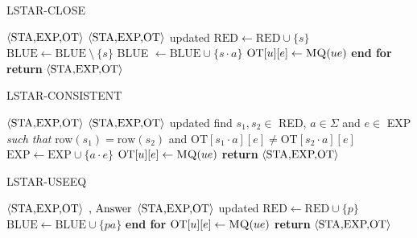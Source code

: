 \begin{algorithm}
\caption{LSTAR-CLOSE}\label{alg:lstar-close}
\begin{algorithmic}[1]
\Statex
\Input $\Braket{\text{STA,EXP,OT}}$
\Output $\Braket{\text{STA,EXP,OT}}$ updated
     \State $\text{RED} \gets \text{RED} \cup \{s\}$
     \State $\text{BLUE} \gets \text{BLUE} \: \setminus \: \{s\}$
      BLUE $\gets \text{BLUE} \cup \{s\cdot a\}$
     \EndFor
      $\text{OT}[u][e] \gets \Call{MQ}{ue}$
\EndFor
\EndFor
\State \textbf{end for}
\State \textbf{return} $\Braket{\text{STA,EXP,OT}}$
\end{algorithmic}
\end{algorithm}

\begin{algorithm}
\caption{LSTAR-CONSISTENT}\label{alg:lstar-consistent}
\begin{algorithmic}[1]
\Statex
\Input $\Braket{\text{STA,EXP,OT}}$
\Output $\Braket{\text{STA,EXP,OT}}$ updated
\State find $s_1, s_2 \in$ RED, $a \in \Sigma$ and $e \in$ EXP \textit{such that} row$(s_1) = \text{row}(s_2)$ and
\State $\text{OT}[s_1 \cdot a][e] \ne \text{OT}[s_2 \cdot a][e]$
\State $\text{EXP} \gets \text{EXP} \cup \{a \cdot e\}$ 
 $\text{OT}[u][e] \gets \Call{MQ}{ue}$
\EndFor
\State \textbf{return} $\Braket{\text{STA,EXP,OT}}$
\end{algorithmic}
\end{algorithm}

\begin{algorithm}
\caption{LSTAR-USEEQ}\label{alg:lstar-useeq}
\begin{algorithmic}[1]
\Statex
\Input $\Braket{\text{STA,EXP,OT}} \text{ ,  Answer}$
\Output $\Braket{\text{STA,EXP,OT}}$ updated
     \State $\text{RED} \gets \text{RED} \cup \{p\}$
      $\text{BLUE} \gets \text{BLUE} \cup \{pa\}$ 
     \EndFor 
\EndFor
\State \textbf{end for}
 $\text{OT}[u][e] \gets \Call{MQ}{ue}$
\EndFor
\State \textbf{return} $\Braket{\text{STA,EXP,OT}}$
\end{algorithmic}
\end{algorithm}

